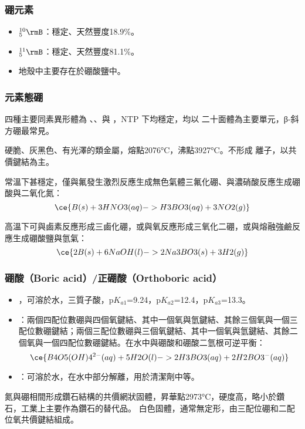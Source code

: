 \documentclass[a4paper,12pt]{report}
\begin{document}
\subsubsection{硼元素}
\begin{itemize}
\item $^{10}_5\rmB$：穩定、天然豐度18.9\%。
\item $^{11}_5\rmB$：穩定、天然豐度81.1\%。
\item 地殼中主要存在於硼酸鹽中。
\end{itemize}
\subsubsection{元素態硼}
\bit
\item 四種主要同素異形體為 、、與 ，NTP 下均穩定，均以  二十面體為主要單元，β-斜方硼最常見。
\item 硬脆、灰黑色、有光澤的類金屬，熔點2076°C，沸點3927°C。不形成  離子，以共價鍵結為主。
\item 常溫下甚穩定，僅與氟發生激烈反應生成無色氣體三氟化硼、與濃硝酸反應生成硼酸與二氧化氮：
\[\ce{B(s) + 3HNO3(aq) -> H3BO3(aq) + 3NO2(g)}\]
\item 高溫下可與鹵素反應形成三鹵化硼，或與氧反應形成三氧化二硼，或與熔融強鹼反應生成硼酸鹽與氫氣：
\[\ce{2B(s) + 6NaOH(l) -> 2Na3BO3(s) + 3H2(g)}\]
\eit
\subsubsection{硼酸（Boric acid）/正硼酸（Orthoboric acid）}
\begin{itemize}
\item {}，可溶於水，三質子酸，p$K_{a1}$=9.24，p$K_{a2}$=12.4，p$K_{a3}$=13.3。
\item {}：兩個四配位數硼與四個氧鍵結、其中一個氧與氫鍵結、其餘三個氧與一個三配位數硼鍵結；兩個三配位數硼與三個氧鍵結、其中一個氧與氫鍵結、其餘二個氧與一個四配位數硼鍵結。在水中與硼酸和硼酸二氫根可逆平衡：
\[\ce{B4O5(OH)4^{2-}(aq) + 5H2O(l) -> 2H3BO3(aq) + 2H2BO3^-(aq)}\]
\item {}：可溶於水，在水中部分解離，用於清潔劑中等。
\end{itemize}
氮與硼相間形成鑽石結構的共價網狀固體，昇華點2973°C，硬度高，略小於鑽石，工業上主要作為鑽石的替代品。
白色固體，通常無定形，由三配位硼和二配位氧共價鍵結組成。
\end{document}
